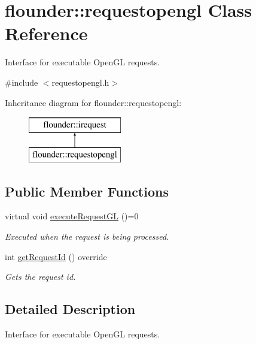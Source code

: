 \hypertarget{classflounder_1_1requestopengl}{}\section{flounder\+:\+:requestopengl Class Reference}
\label{classflounder_1_1requestopengl}


Interface for executable Open\+GL requests.  




{\ttfamily \#include $<$requestopengl.\+h$>$}

Inheritance diagram for flounder\+:\+:requestopengl\+:\begin{figure}[H]
\begin{center}
\leavevmode
\includegraphics[height=2.000000cm]{classflounder_1_1requestopengl}
\end{center}
\end{figure}
\subsection*{Public Member Functions}
\begin{DoxyCompactItemize}
\item 
virtual void \hyperlink{classflounder_1_1requestopengl_abc16ac9157ca6f6ebd3a556469ad5d51}{execute\+Request\+GL} ()=0
\begin{DoxyCompactList}\small\item\em Executed when the request is being processed. \end{DoxyCompactList}\item 
int \hyperlink{classflounder_1_1requestopengl_a897fbd9310873f5a2972764b5d855409}{get\+Request\+Id} () override
\begin{DoxyCompactList}\small\item\em Gets the request id. \end{DoxyCompactList}\end{DoxyCompactItemize}


\subsection{Detailed Description}
Interface for executable Open\+GL requests. 



